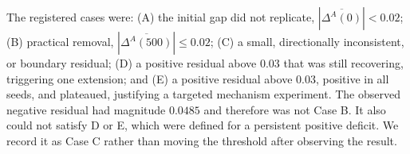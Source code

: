 \documentclass{article}
\begin{document}
The registered cases were: (A) the initial gap did not replicate, $|\overline{\Delta^A(0)}|<0.02$; (B) practical removal, $|\overline{\Delta^A(500)}|\leq0.02$; (C) a small, directionally inconsistent, or boundary residual; (D) a positive residual above $0.03$ that was still recovering, triggering one extension; and (E) a positive residual above $0.03$, positive in all seeds, and plateaued, justifying a targeted mechanism experiment. The observed negative residual had magnitude $0.0485$ and therefore was not Case B. It also could not satisfy D or E, which were defined for a persistent positive deficit. We record it as Case C rather than moving the threshold after observing the result.
\end{document}
